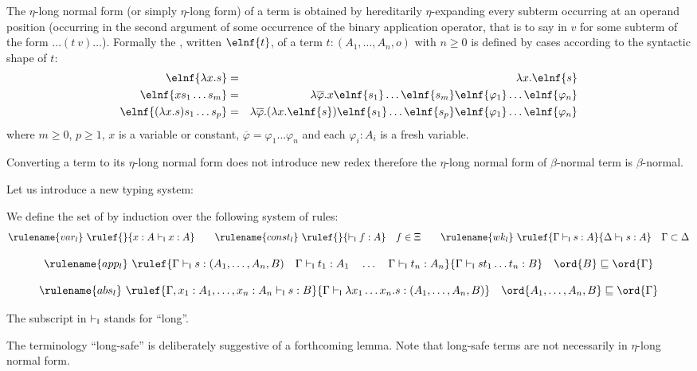 The $\eta$-long normal form (or simply $\eta$-long form) of a term
is obtained by hereditarily $\eta$-expanding every subterm occurring
at an operand position (\ie occurring in the second argument of some
occurrence of the binary application operator, that is to say in $v$
for some subterm of the form $\ldots (t~v) \ldots$). Formally the
, written $\elnf{t}$, of a term $t:
(A_1,\ldots,A_n,o)$ with $n \geq 0$ is defined by cases according to
the syntactic shape of $t$:
\begin{eqnarray*}
  \elnf{\lambda x . s } &=& \lambda x . \elnf{s} \\
  \elnf{x s_1 \ldots s_m } &=& \lambda \overline{\varphi} . x \elnf{s_1}\ldots \elnf{s_m} \elnf{\varphi_1} \ldots \elnf{\varphi_n} \\
  \elnf{(\lambda x . s) s_1 \ldots s_p } &=& \lambda \overline{\varphi} . (\lambda x . \elnf{s}) \elnf{s_1} \ldots \elnf{s_p} \elnf{\varphi_1} \ldots \elnf{\varphi_n}
\end{eqnarray*}
where $m \geq 0$, $p\geq 1$, $x$ is a  variable or constant, $\overline{\varphi} = \varphi_1 \ldots \varphi_n$ and each $\varphi_i : A_i$ is a fresh variable.

\begin{remark}
  Converting a term to its $\eta$-long normal form does not introduce
  new redex therefore the $\eta$-long normal form of $\beta$-normal
  term is $\beta$-normal.
\end{remark}

Let us introduce a new typing system:
\begin{definition}
\label{dfn:longsafe}
We define the set of 
by induction over the following system of rules:
  $$ \rulename{var_l} \ \rulef{}{x : A\lsentail x : A} \qquad
\rulename{const_l} \ \rulef{}{\lsentail f : A}\quad f \in \Xi \qquad
\rulename{wk_l} \ \rulef{\Gamma \lsentail s : A}{\Delta \lsentail s : A}\quad
\Gamma \subset \Delta$$

$$ \rulename{app_l} \ \rulef{\Gamma \lsentail s : (A_1,\ldots,A_n,B)
\quad
  \Gamma \lsentail t_1 : A_1 \quad \ldots \quad \Gamma \lsentail t_n : A_n
} {\Gamma \lsentail s t_1 \ldots t_n : B} \quad \ord{B} \sqsubseteq
\ord{\Gamma}$$

$$ \rulename{abs_l} \ \rulef{\Gamma, x_1 : A_1, \ldots, x_n : A_n
  \lsentail s : B} {\Gamma \lsentail \lambda x_1 \ldots x_n . s :
  (A_1, \ldots ,A_n,B)} \quad \ord{A_1, \ldots ,A_n,B} \sqsubseteq
\ord{\Gamma}$$
\smallskip

The subscript in $\vdash_{\sf l}$ stands for ``long''.
\end{definition}
The terminology ``long-safe'' is deliberately suggestive of a forthcoming lemma. Note that long-safe terms are not necessarily in $\eta$-long normal form.


